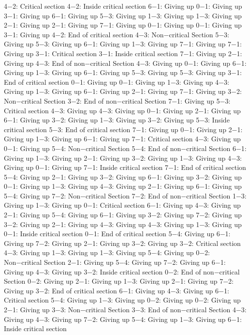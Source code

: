 4−2: Critical section
4−2: Inside critical section
6−1: Giving up
0−1: Giving up
3−1: Giving up
6−1: Giving up
5−3: Giving up
1−3: Giving up
1−3: Giving up
2−1: Giving up
2−1: Giving up
7−1: Giving up
0−1: Giving up
0−1: Giving up
3−1: Giving up
4−2: End of critical section
4−3: Non−critical Section
5−3: Giving up
5−3: Giving up
6−1: Giving up
1−3: Giving up
7−1: Giving up
7−1: Giving up
3−1: Critical section
3−1: Inside critical section
7−1: Giving up
2−1: Giving up
4−3: End of non−critical Section
4−3: Giving up
0−1: Giving up
6−1: Giving up
1−3: Giving up
6−1: Giving up
5−3: Giving up
5−3: Giving up
3−1: End of critical section
0−1: Giving up
0−1: Giving up
1−3: Giving up
4−3: Giving up
1−3: Giving up
6−1: Giving up
2−1: Giving up
7−1: Giving up
3−2: Non−critical Section
3−2: End of non−critical Section
7−1: Giving up
5−3: Critical section
4−3: Giving up
4−3: Giving up
0−1: Giving up
2−1: Giving up
6−1: Giving up
3−2: Giving up
1−3: Giving up
3−2: Giving up
5−3: Inside critical section
5−3: End of critical section
7−1: Giving up
0−1: Giving up
2−1: Giving up
1−3: Giving up
6−1: Giving up
7−1: Critical section
4−3: Giving up
0−1: Giving up
5−4: Non−critical Section
5−4: End of non−critical Section
6−1: Giving up
1−3: Giving up
2−1: Giving up
3−2: Giving up
1−3: Giving up
4−3: Giving up
0−1: Giving up
7−1: Inside critical section
7−1: End of critical section
5−4: Giving up
2−1: Giving up
3−2: Giving up
6−1: Giving up
3−2: Giving up
0−1: Giving up
1−3: Giving up
4−3: Giving up
2−1: Giving up
6−1: Giving up
5−4: Giving up
7−2: Non−critical Section
7−2: End of non−critical Section
1−3: Giving up
1−3: Giving up
0−1: Critical section
6−1: Giving up
4−3: Giving up
2−1: Giving up
5−4: Giving up
6−1: Giving up
3−2: Giving up
7−2: Giving up
3−2: Giving up
2−1: Giving up
4−3: Giving up
4−3: Giving up
1−3: Giving up
0−1: Inside critical section
0−1: End of critical section
5−4: Giving up
6−1: Giving up
7−2: Giving up
2−1: Giving up
3−2: Giving up
3−2: Critical section
4−3: Giving up
1−3: Giving up
1−3: Giving up
5−4: Giving up
0−2: Non−critical Section
2−1: Giving up
5−4: Giving up
7−2: Giving up
6−1: Giving up
4−3: Giving up
3−2: Inside critical section
0−2: End of non−critical Section
0−2: Giving up
2−1: Giving up
1−3: Giving up
2−1: Giving up
7−2: Giving up
3−2: End of critical section
6−1: Giving up
4−3: Giving up
6−1: Critical section
5−4: Giving up
1−3: Giving up
0−2: Giving up
0−2: Giving up
2−1: Giving up
3−3: Non−critical Section
3−3: End of non−critical Section
4−3: Giving up
4−3: Giving up
7−2: Giving up
5−4: Giving up
1−3: Giving up
6−1: Inside critical section
